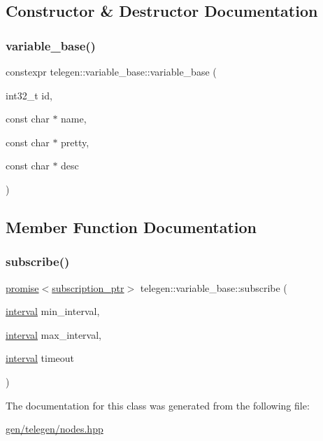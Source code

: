 \subsection{Constructor \& Destructor Documentation}
\mbox{\label{classtelegen_1_1variable__base_a54d7c52810b54d24df2a227d5a1b177d}} 
\subsubsection{\texorpdfstring{variable\+\_\+base()}{variable\_base()}}
{\footnotesize\ttfamily constexpr telegen\+::variable\+\_\+base\+::variable\+\_\+base (\begin{DoxyParamCaption}\item[{int32\+\_\+t}]{id,  }\item[{const char $\ast$}]{name,  }\item[{const char $\ast$}]{pretty,  }\item[{const char $\ast$}]{desc }\end{DoxyParamCaption})\hspace{0.3cm}{\ttfamily [inline]}}



\subsection{Member Function Documentation}
\mbox{\label{classtelegen_1_1variable__base_a9ee161bdcfd820aa9dbb750a8140d110}} 
\subsubsection{\texorpdfstring{subscribe()}{subscribe()}}
{\footnotesize\ttfamily \hyperlink{namespacetelegen_a9dd802bb5d30cf96b0c616750d43ae86}{promise}$<$\hyperlink{namespacetelegen_a27c822534a5231fe1c523c81e8768afb}{subscription\+\_\+ptr}$>$ telegen\+::variable\+\_\+base\+::subscribe (\begin{DoxyParamCaption}\item[{\hyperlink{namespacetelegen_ad925de2d0a99bc43918533abf0457344}{interval}}]{min\+\_\+interval,  }\item[{\hyperlink{namespacetelegen_ad925de2d0a99bc43918533abf0457344}{interval}}]{max\+\_\+interval,  }\item[{\hyperlink{namespacetelegen_ad925de2d0a99bc43918533abf0457344}{interval}}]{timeout }\end{DoxyParamCaption})\hspace{0.3cm}{\ttfamily [inline]}}



The documentation for this class was generated from the following file\+:\begin{DoxyCompactItemize}
\item 
\hyperlink{gen_2telegen_2nodes_8hpp}{gen/telegen/nodes.\+hpp}\end{DoxyCompactItemize}
